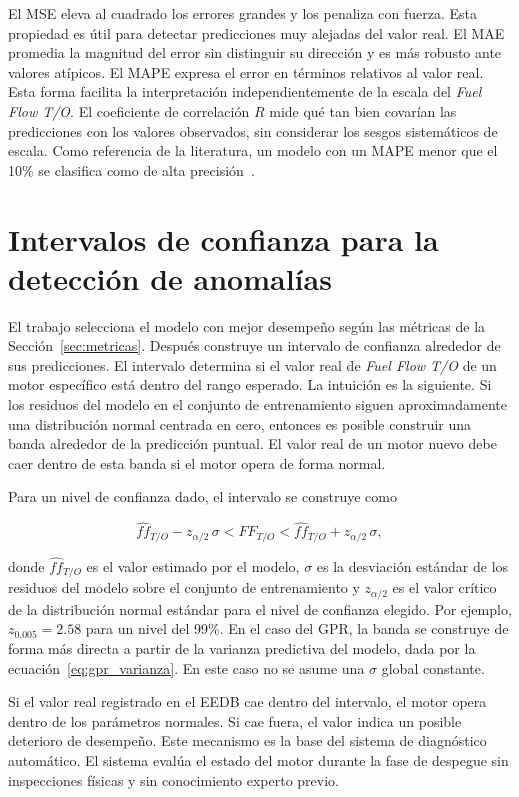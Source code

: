 El MSE eleva al cuadrado los errores grandes y los penaliza con fuerza. Esta propiedad es útil para detectar predicciones muy alejadas del valor real. El MAE promedia la magnitud del error sin distinguir su dirección y es más robusto ante valores atípicos. El MAPE expresa el error en términos relativos al valor real. Esta forma facilita la interpretación independientemente de la escala del \textit{Fuel Flow T/O}. El coeficiente de correlación $R$ mide qué tan bien covarían las predicciones con los valores observados, sin considerar los sesgos sistemáticos de escala. Como referencia de la literatura, un modelo con un MAPE menor que el 10\% se clasifica como de alta precisión~\cite{Lewis1982}.

\section{Intervalos de confianza para la detección de anomalías}
\label{sec:intervalos}

El trabajo selecciona el modelo con mejor desempeño según las métricas de la Sección~\ref{sec:metricas}. Después construye un intervalo de confianza alrededor de sus predicciones. El intervalo determina si el valor real de \textit{Fuel Flow T/O} de un motor específico está dentro del rango esperado. La intuición es la siguiente. Si los residuos del modelo en el conjunto de entrenamiento siguen aproximadamente una distribución normal centrada en cero, entonces es posible construir una banda alrededor de la predicción puntual. El valor real de un motor nuevo debe caer dentro de esta banda si el motor opera de forma normal.

Para un nivel de confianza dado, el intervalo se construye como

\begin{equation}
\hat{ff}_{T/O} - z_{\alpha/2}\,\sigma < FF_{T/O} < \hat{ff}_{T/O} + z_{\alpha/2}\,\sigma,
\label{eq:intervalo_confianza_teorico}
\end{equation}

donde $\hat{ff}_{T/O}$ es el valor estimado por el modelo, $\sigma$ es la desviación estándar de los residuos del modelo sobre el conjunto de entrenamiento y $z_{\alpha/2}$ es el valor crítico de la distribución normal estándar para el nivel de confianza elegido. Por ejemplo, $z_{0.005}=2.58$ para un nivel del 99\%. En el caso del GPR, la banda se construye de forma más directa a partir de la varianza predictiva del modelo, dada por la ecuación~\eqref{eq:gpr_varianza}. En este caso no se asume una $\sigma$ global constante.

Si el valor real registrado en el EEDB cae dentro del intervalo, el motor opera dentro de los parámetros normales. Si cae fuera, el valor indica un posible deterioro de desempeño. Este mecanismo es la base del sistema de diagnóstico automático. El sistema evalúa el estado del motor durante la fase de despegue sin inspecciones físicas y sin conocimiento experto previo.
